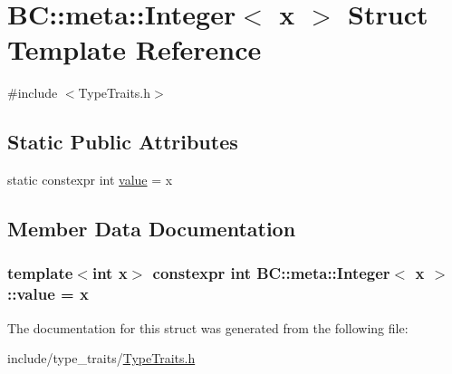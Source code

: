 \hypertarget{structBC_1_1meta_1_1Integer}{}\section{BC\+:\+:meta\+:\+:Integer$<$ x $>$ Struct Template Reference}
\label{structBC_1_1meta_1_1Integer}


{\ttfamily \#include $<$Type\+Traits.\+h$>$}

\subsection*{Static Public Attributes}
\begin{DoxyCompactItemize}
\item 
static constexpr int \hyperlink{structBC_1_1meta_1_1Integer_a024783dc86b55bcd02ab71eee285aab0}{value} = x
\end{DoxyCompactItemize}


\subsection{Member Data Documentation}
\subsubsection[{\texorpdfstring{value}{value}}]{\setlength{\rightskip}{0pt plus 5cm}template$<$int x$>$ constexpr int {\bf B\+C\+::meta\+::\+Integer}$<$ x $>$\+::value = x\hspace{0.3cm}{\ttfamily [static]}}\hypertarget{structBC_1_1meta_1_1Integer_a024783dc86b55bcd02ab71eee285aab0}{}\label{structBC_1_1meta_1_1Integer_a024783dc86b55bcd02ab71eee285aab0}


The documentation for this struct was generated from the following file\+:\begin{DoxyCompactItemize}
\item 
include/type\+\_\+traits/\hyperlink{TypeTraits_8h}{Type\+Traits.\+h}\end{DoxyCompactItemize}

